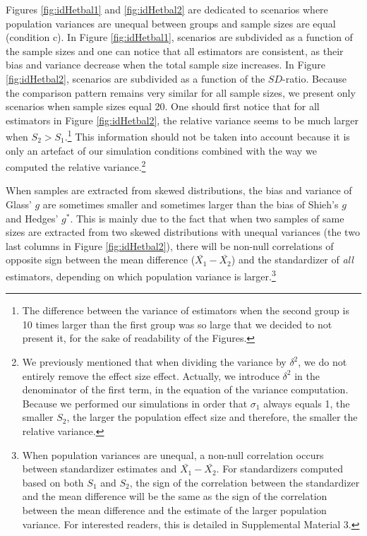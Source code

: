 \documentclass[
  english,
  man,floatsintext]{apa6}
\begin{document}
Figures \ref{fig:idHetbal1} and \ref{fig:idHetbal2} are dedicated to scenarios where population variances are unequal between groups and sample sizes are equal (condition c). In Figure \ref{fig:idHetbal1}, scenarios are subdivided as a function of the sample sizes and one can notice that all estimators are consistent, as their bias and variance decrease when the total sample size increases. In Figure \ref{fig:idHetbal2}, scenarios are subdivided as a function of the \(SD\)-ratio. Because the comparison pattern remains very similar for all sample sizes, we present only scenarios when sample sizes equal 20. One should first notice that for all estimators in Figure \ref{fig:idHetbal2}, the relative variance seems to be much larger when \(S_2>S_1\).\footnote{The difference between the variance of estimators when the second group is 10 times larger than the first group was so large that we decided to not present it, for the sake of readability of the Figures.} This information should not be taken into account because it is only an artefact of our simulation conditions combined with the way we computed the relative variance.\footnote{We previously mentioned that when dividing the variance by $\delta^2$, we do not entirely remove the effect size effect. Actually, we introduce $\delta^2$ in the denominator of the first term, in the equation of the variance computation. Because we performed our simulations in order that $\sigma_1$ always equals 1, the smaller $S_2$, the larger the population effect size and therefore, the smaller the relative variance.}

When samples are extracted from skewed distributions, the bias and variance of Glass' \(g\) are sometimes smaller and sometimes larger than the bias of Shieh's \(g\) and Hedges' \(g^*\). This is mainly due to the fact that when two samples of same sizes are extracted from two skewed distributions with unequal variances (the two last columns in Figure \ref{fig:idHetbal2}), there will be non-null correlations of opposite sign between the mean difference (\(\bar{X_1}-\bar{X_2}\)) and the standardizer of \emph{all} estimators, depending on which population variance is larger.\footnote{When population variances are unequal, a non-null correlation occurs between standardizer estimates and $\bar{X_1}-\bar{X_2}$. For standardizers computed based on both $S_1$ and $S_2$, the sign of the correlation between the standardizer and the mean difference will be the same as the sign of the correlation between the mean difference and the estimate of the larger population variance. For interested readers, this is detailed in Supplemental Material 3.}
\end{document}

